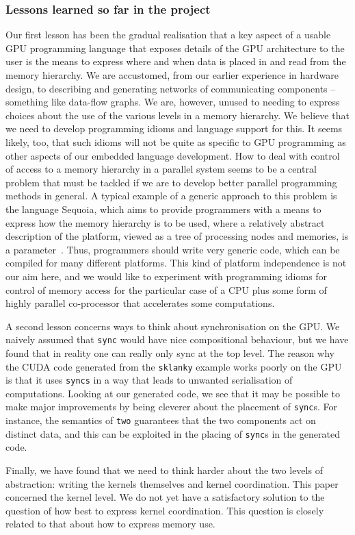 \subsubsection{Lessons learned so far in the project}
Our first lesson has been the gradual realisation that a key aspect of a usable
GPU programming language that exposes details of the GPU architecture to the user is the means to express where and when data is placed in and
read from the memory hierarchy.
We are accustomed, from our earlier experience in hardware design, to describing
and generating networks of communicating components -- something like data-flow graphs. We are, however, unused to needing to express choices about the use
of the various levels in a memory hierarchy. We believe that we need to develop programming idioms and language support for this. It seems likely, too, that such idioms will not be quite as specific to GPU programming as other aspects of our embedded language development. How to deal with control of access to
a memory hierarchy in a parallel system seems to be a central problem that must be tackled if we are to develop better parallel programming methods in general.
A typical example of a generic approach to this problem is
the language Sequoia, which aims to provide programmers with a means
to express how the memory hierarchy is to be used, where a relatively abstract description of
the platform, viewed as a tree of processing nodes and memories, is a parameter~. Thus, programmers should write very generic code, which can be compiled for many different platforms. This kind of platform independence is not our aim here, and we would like to experiment with programming idioms for control of memory access for the particular case of a CPU plus some form of highly parallel co-processor that accelerates some computations.

A second lesson concerns ways to think about synchronisation on the GPU. We naively assumed that {\tt sync} would have nice compositional behaviour, but we have found that in reality one can really only sync at the top level.
The reason why the CUDA code generated from the {\tt sklanky} example works poorly on the GPU is that it uses {\tt syncs} in a way that leads to unwanted
serialisation of computations. Looking at our generated code, we see that it may be possible to make major improvements by being cleverer about the placement
of {\tt sync}s. For instance, the semantics of {\tt two} guarantees that the two components act on distinct data, and this can be exploited in the placing of {\tt sync}s in the generated code.

Finally, we have found that we need to think harder about the two levels of
abstraction: writing the kernels themselves and kernel coordination. This paper concerned the kernel level. We do not yet have a satisfactory solution to the question of how best to express kernel coordination. This question is closely related to that about how to express memory use.





